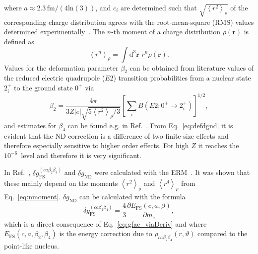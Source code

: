 where $a\approx 2.3\,\text{fm}/(4\text{ln}(3))$, and $c_i$ are determined such that $\sqrt{\left<r^2\right>_{\rho}}$ of the corresponding charge distribution agrees with the root-mean-square (RMS) values determined experimentally~\cite{Angeli2013}. The $n$-th moment of a charge distribution $\rho(\mathbf{r})$ is defined as
\begin{equation}
\left< r^n \right>_{\rho} = \int \text{d}^3\mathbf{r}\,\, r^n \rho(\mathbf{r}).
\label{eq:nmoment}
\end{equation}
Values for the deformation parameter $\beta_2$ can be obtained from literature values of the reduced electric quadrupole ($E2$) transition probabilities from a nuclear state $2^+_i$ to the ground state $0^+$ via~\cite{Trager}
\begin{equation}
\beta_2 = \frac{4\pi}{3Z|e|\sqrt{5\left< r^2\right>_{\rho} /3}}\left[ \sum_i B(E2;0^+\rightarrow 2_i^+) \right]^{1/2},
\label{eq:beta}
\end{equation}
and estimates for $\beta_4$ can be found e.g. in Ref.~\cite{Moller1995}.
From Eq.~\eqref{eq:defdgnd} it is evident that the ND correction is a difference of two finite-size effects and therefore especially sensitive to higher order effects. For high $Z$ it reaches the $10^{-6}$~level and therefore it is very significant.

In Ref.~\cite{jacek2012}, $\delta g_{\text{FS}}^{(ca\beta_2\beta_4)}$ and $\delta g_{\text{ND}}$ were calculated with the ERM~\cite{Shabaev1993}. It was shown that these mainly depend on the moments $\left< r^2 \right>_{\rho}$ and $\left< r^4 \right>_{\rho}$ from Eq.~\eqref{eq:nmoment}.
$\delta g_{\text{ND}}$ can be calculated with the formula~\cite{Karshenboim2005}
\begin{equation}
\delta g^{(ca\beta_2\beta_4)}_{\text{FS}}=\frac{4}{3}\frac{\partial E_{\text{FS}}(c,a,\beta)}{\partial m_e},
\label{eq:effrad}
\end{equation}
which is a direct consequence of Eq.~\eqref{eq:gfac_viaDeriv} and where $E_{\text{FS}}(c,a,\beta_2,\beta_4)$ is the energy correction due to $\rho_{ca\beta_2\beta_4}(r,\vartheta)$ compared to the point-like nucleus.

